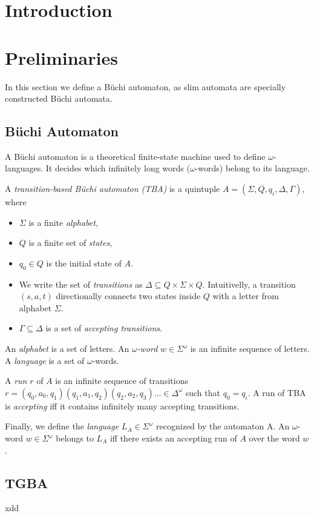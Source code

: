 \documentclass[
	digital
nolof, nolot
]{fithesis3}
\begin{document}
	\chapter{Introduction}
	\chapter{Preliminaries}
		In this section we define a Büchi automaton, as slim automata are specially constructed Büchi automata.
		\section{Büchi Automaton}
			A Büchi automaton is a theoretical finite-state machine used to define $\omega$-languages. It decides which infinitely long words ($\omega$-words) belong to its language.
			
			A \emph{transition-based Büchi automaton (TBA)} is a quintuple $A=(\Sigma, Q, q_i, \Delta, \Gamma)$, where 
			\begin{itemize}
				\item $\Sigma$ is a finite \emph{alphabet},
				\item $Q$ is a finite set of \emph{states},
				\item $q_0 \in Q$ is the initial state of $A$.
				\item We write the set of \emph{transitions} as $\Delta \subseteq Q \times \Sigma \times Q$. Intuitivelly, a transition $(s, a, t)$  directionally connects two states inside $Q$ with a letter from alphabet $\Sigma$. 
				\item $\Gamma \subseteq \Delta$ is a set of \emph{accepting transitions}.
			\end{itemize}

			 An \emph{alphabet} is a set of letters. An \emph{$\omega$-word} $w \in \Sigma^\omega$ is an infinite sequence of letters. A \emph{language} is a set of $\omega$-words.
			
			A \emph{run} $r$ of $A$ is an infinite sequence of transitions
			$r=(q_0, a_0, q_1)(q_1, a_1, q_2)(q_2, a_2, q_3)\ldots\in\Delta^\omega$ such that $q_0=q_i$.
			A run of TBA is \emph{accepting} iff it contains infinitely many accepting transitions.

			Finally, we define the \emph{language} $L_A \in \Sigma^\omega$ recognized by the automaton A. An $\omega$-word $w \in \Sigma^\omega$ belongs to $L_A$ iff there exists an accepting run of $A$ over the word $w$. 
			
		\section{TGBA}
		xdd
		
\end{document}
